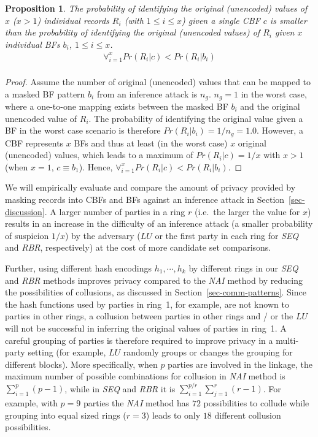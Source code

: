 \documentclass{sig-alternate}
\newtheorem{prop}[theorem]{Proposition}
\begin{document}
\begin{prop}
The probability of identifying the original (unencoded)
values of $x$ ($x > 1$)
individual records $R_i$ (with $1 \le i \le x$) given a single CBF $c$
is smaller than the probability of
identifying the original (unencoded values) of $R_i$ given
$x$ individual BFs $b_i$, $1 \le i \le x$.
\begin{eqnarray}
\label{eq:pr_inf} 
\forall_{i=1}^{x} Pr(R_i|c) < Pr(R_i|b_i) \nonumber
\\
\end{eqnarray}
\end{prop}

\begin{proof}
Assume the number of original (unencoded) values that can be mapped to a masked BF pattern $b_i$ from an inference attack is $n_g$. $n_g = 1$ in the worst case, where a one-to-one mapping exists between the masked BF $b_i$ and the original unencoded value of $R_i$. The probability of identifying the original value given a BF in the worst case scenario is therefore $Pr(R_i|b_i) = 1/n_g = 1.0$.
However, a CBF represents $x$ BFs and thus at least (in the worst case) $x$ original (unencoded) values, which leads to a maximum of $Pr(R_i|c) = 1/x$ with $x>1$ (when $x=1$, $c \equiv b_1$). Hence, $\forall_{i=1}^{x} Pr(R_i|c) < Pr(R_i|b_i)$.
\end{proof}


We will empirically evaluate and compare the amount of privacy
provided by masking records into CBFs and BFs against an
inference attack in Section~\ref{sec-discussion}.
A larger number of parties in a ring $r$ 
(i.e.\ the larger the value for $x$) results in an
increase in the difficulty of an inference attack 
(a smaller probability of suspicion $1/x$)
by the adversary ($LU$ or the first party in each ring
for \emph{SEQ} and \emph{RBR}, respectively) at the cost of more
candidate set comparisons.

Further, using different hash encodings $h_1,\cdots,h_k$ by different
rings in our \emph{SEQ} and \emph{RBR} methods improves privacy 
compared to the \emph{NAI} method by reducing the possibilities of
collusions, as discussed in Section~\ref{sec-comm-patterns}.
Since the hash functions used by parties in ring~1, for example, are not
known to parties in other rings, a collusion between parties in other
rings and / or the $LU$ will not be successful in inferring the original
values of parties in ring~1. A careful grouping of parties is therefore
required to improve privacy in a multi-party setting (for example,
$LU$ randomly groups or changes the grouping 
for different blocks). More specifically,
when $p$ parties are involved in the linkage,
the maximum number of possible combinations for collusion in \emph{NAI}
method is 
$\sum_{i=1}^p (p-1)$, while in \emph{SEQ} and \emph{RBR} it is
$\sum_{i=1}^{p/r} \sum_{j=1}^{r} (r -1)$. For example, with $p=9$
parties the \emph{NAI} method has $72$ possibilities to collude
while grouping into equal sized rings ($r=3$) leads to only $18$ different
collusion possibilities.
\end{document}

